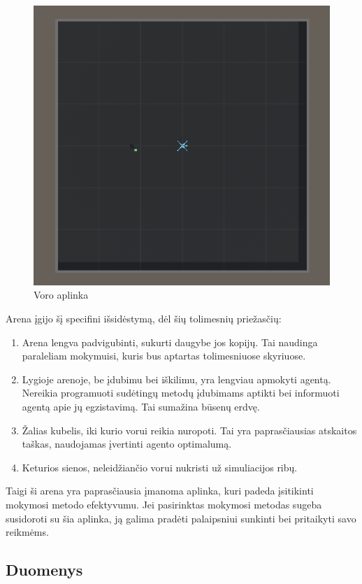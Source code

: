 \documentclass[a4paper, 12pt]{article}
\begin{document}
\begin{figure}[h!]
\centering
\includegraphics[width=.7\textwidth]{arena}
\caption{Voro aplinka}
\label{arena}
\end{figure}

Arena įgijo šį specifini išsidėstymą, dėl šių tolimesnių priežasčių:

\begin{enumerate}
  \addtolength{\itemsep}{-0.5\baselineskip} 
  \item Arena lengva padvigubinti, sukurti daugybe jos kopijų. Tai naudinga paraleliam mokymuisi, kuris bus aptartas tolimesniuose skyriuose.
  \item Lygioje arenoje, be įdubimu bei iškilimu, yra lengviau apmokyti agentą. Nereikia programuoti sudėtingų metodų įdubimams aptikti bei informuoti agentą apie jų egzistavimą. Tai sumažina būsenų erdvę.
  \item Žalias kubelis, iki kurio vorui reikia nuropoti. Tai yra paprasčiausias atskaitos taškas, naudojamas įvertinti agento optimalumą.
  \item Keturios sienos, neleidžiančio vorui nukristi už simuliacijos ribų.
\end{enumerate}

Taigi ši arena yra paprasčiausia įmanoma aplinka, kuri padeda įsitikinti mokymosi metodo efektyvumu. Jei pasirinktas mokymosi metodas sugeba susidoroti su šia aplinka, ją galima pradėti palaipsniui sunkinti bei pritaikyti savo reikmėms.

\subsection{Duomenys}
\end{document}
